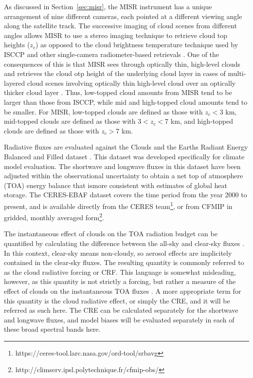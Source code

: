 As discussed in Section~\ref{sec:misr}, the MISR instrument has a unique
arrangement of nine different cameras, each pointed at a different
viewing angle along the satellite track. The successive imaging of cloud
scenes from different angles allows MISR to use a stereo imaging
technique to retrieve cloud top heights (\(z_c\)) as opposed to the
cloud brightness temperature technique used by ISCCP and other
single-camera radiometer-based retrievals
\citep{moroney_et_al_2002, muller_et_al_2002}. One of the consequences
of this is that MISR sees through optically thin, high-level clouds and
retrieves the cloud otp height of the underlying cloud layer in cases of
multi-layered cloud scenes involving optically thin high-level cloud
over an optically thicker cloud layer \citep{marchand_et_al_2010}. Thus,
low-topped cloud amounts from MISR tend to be larger than those from
ISCCP, while mid and high-topped cloud amounts tend to be smaller. For
MISR, low-topped clouds are defined as those with \(z_c < 3\) km,
mid-topped clouds are defined as those with \(3 < z_c < 7\) km, and
high-topped clouds are defined as those with \(z_c > 7\) km.

Radiative fluxes are evaluated against the Clouds and the Earths Radiant
Energy Balanced and Filled dataset \citep[CERES-EBAF Version
2.6;][]{loeb_et_al_2009}. This dataset was developed specifically for
climate model evaluation. The shortwave and longwave fluxes in this
dataset have been adjusted within the observational uncertainty to
obtain a net top of atmosphere (TOA) energy balance that ismore
consistent with estimates of global heat storage. The CERES-EBAF dataset
covers the time period from the year 2000 to present, and is available
directly from the CERES team\footnote{https://ceres-tool.larc.nasa.gov/ord-tool/srbavg},
or from CFMIP in gridded, monthly averaged form\footnote{http://climserv.ipsl.polytechnique.fr/cfmip-obs/}.

The instantaneous effect of clouds on the TOA radiation budget can be
quantified by calculating the difference between the all-sky and
clear-sky fluxes
\citep[e.g.,][]{ellis_and_vonderhaar_1976, ramanathan_1987, ramanathan_et_al_1989}.
In this context, clear-sky means non-cloudy, so aerosol effects are
implicitely contained in the clear-sky fluxes. The resulting quantity is
commonly referred to as the cloud radiative forcing or CRF. This
language is somewhat misleading, however, as this quantity is not
strictly a forcing, but rather a measure of the effect of clouds on the
instantaneous TOA fluxes \citep{stephens_2005}. A more appropriate term
for this quantity is the cloud radiative effect, or simply the CRE, and
it will be referred as such here. The CRE can be calculated separately
for the shortwave and longwave fluxes, and model biases will be
evaluated separately in each of these broad spectral bands here.

